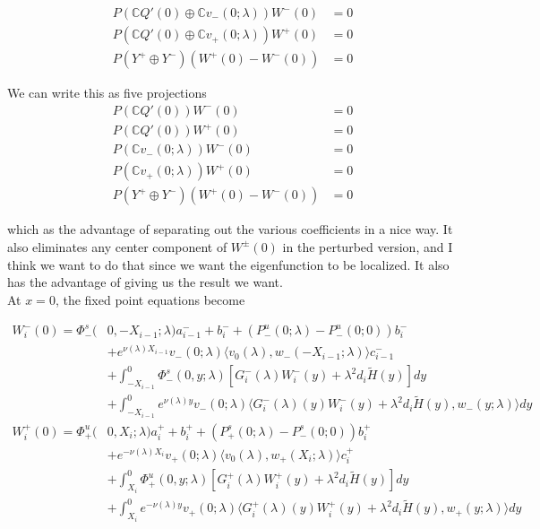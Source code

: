 \documentclass[12pt]{article}
\def\C{{\mathbb C}}
\begin{document}
\begin{enumerate}
\begin{align*}
P(\C Q'(0) \oplus \C v_-(0; \lambda) )W^-(0) &= 0 \\
P(\C Q'(0) \oplus \C v_+(0; \lambda) )W^+(0) &= 0 \\
P(Y^+ \oplus Y^-) (W^+(0) - W^-(0) ) &= 0
\end{align*}

We can write this as five projections
\begin{align*}
P(\C Q'(0) )W^-(0) &= 0 \\
P(\C Q'(0) )W^+(0) &= 0 \\
P(\C v_-(0; \lambda))W^-(0) &= 0 \\
P(\C v_+(0; \lambda))W^+(0) &= 0 \\
P(Y^+ \oplus Y^-) (W^+(0) - W^-(0) ) &= 0
\end{align*}

which as the advantage of separating out the various coefficients in a nice way. It also eliminates any center component of $W^\pm(0)$ in the perturbed version, and I think we want to do that since we want the eigenfunction to be localized. It also has the advantage of giving us the result we want.\\

At $x = 0$, the fixed point equations become

\begin{align*}
W_i^-(0) = \Phi^s_-(&0, -X_{i-1}; \lambda)a_{i-1}^- + b_i^- + (P^u_-(0; \lambda) - P^u_-(0; 0))b_i^- \\
&+ e^{\nu(\lambda)X_{i-1}} v_-(0; \lambda) \langle v_0(\lambda), w_-(-X_{i-1}; \lambda) \rangle c_{i-1}^- \\
&+ \int_{-X_{i-1}}^0 \Phi^s_-(0, y; \lambda) [ G_i^-(\lambda)W_i^-(y) + \lambda^2 d_i \tilde{H}(y) ] dy \\
&+ \int_{-X_{i-1}}^0
e^{\nu(\lambda)y} v_-(0; \lambda) \langle G_i^-(\lambda)(y)W_i^-(y) + \lambda^2 d_i \tilde{H}(y), w_-(y; \lambda) \rangle dy \\
W_i^+(0) = \Phi^u_+(&0, X_i; \lambda)a_i^+ + b_i^+ + (P^s_+(0; \lambda) - P^s_-(0; 0))b_i^+ \\
&+ e^{-\nu(\lambda) X_i} v_+(0; \lambda) \langle v_0(\lambda), w_+(X_i; \lambda) \rangle c_i^+ \\
&+ \int_{X_i}^0 \Phi^u_+(0, y; \lambda) [ G_i^+(\lambda)W_i^+(y) + \lambda^2 d_i \tilde{H}(y) ] dy \\
&+ \int_{X_i}^0 e^{-\nu(\lambda)y} v_+(0; \lambda) \langle G_i^+(\lambda)(y)W_i^+(y) + \lambda^2 d_i \tilde{H}(y), w_+(y; \lambda) \rangle dy
\end{align*}


\end{enumerate}
\end{document}
